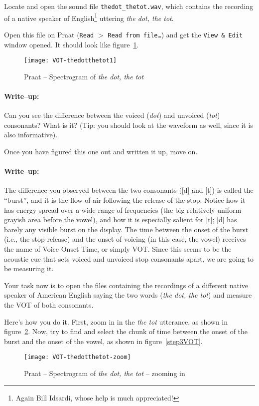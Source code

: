 \documentclass{article}
\newcommand{\soft}[1]{\textsf{#1}}
\newcommand{\filefmat}[1]{\texttt{#1}}
\newcommand{\softmenu}[1]{\texttt{#1}}
\newcommand{\Praat}{\soft{Praat}}
\begin{document}
Locate and open the sound file \filefmat{thedot\_thetot.wav}, which contains the recording of a native speaker of English\footnote{Again Bill Idsardi, whose help is much appreciated!} uttering \emph{the dot, the tot}.

Open this file on \Praat{} (\softmenu{Read} $>$ \softmenu{Read from file\ldots}) and get the \softmenu{View \& Edit} window opened. It should look like figure~\ref{step1VOT}.

\begin{figure}[!tbp]
\caption{\Praat{} -- Spectrogram of \emph{the dot, the tot}}
\label{step1VOT}
	\begin{center}
		\texttt{[image: VOT-thedotthetot1]}
	\end{center}
\end{figure}

\paragraph{Write--up:} Can you see the difference between the voiced (\emph{dot}) and unvoiced (\emph{tot}) consonants? What is it? (Tip: you should look at the waveform as well, since it is also informative).

Once you have figured this one out and written it up, move on.

\paragraph{Write--up:} The difference you observed between the two consonants ([d] and [t]) is called the ``burst'', and it is the flow of air following the release of the stop. Notice how it has energy spread over a wide range of frequencies (the big relatively uniform grayish area before the vowel), and how it is especially salient for [t]; [d] has barely any visible burst on the display. The time between the onset of the burst (i.e., the stop release) and the onset of voicing (in this case, the vowel) receives the name of Voice Onset Time, or simply VOT. Since this seems to be the acoustic cue that sets voiced and unvoiced stop consonants apart, we are going to be measuring it.

Your task now is to open the files containing the recordings of a different native speaker of American English saying the two words (\emph{the dot, the tot}) and measure the VOT of both consonants.

Here's how you do it. First, zoom in in the \emph{the tot} utterance, as shown in figure~\ref{step2VOT}. Now, try to find and select the chunk of time between the onset of the burst and the onset of the vowel, as shown in figure~\ref{step3VOT}. 
\begin{figure}[!tbp]
\caption{\Praat{} -- Spectrogram of \emph{the dot, the tot} -- zooming in}
\label{step2VOT}
	\begin{center}
		\texttt{[image: VOT-thedotthetot-zoom]}
	\end{center}
\end{figure}
\end{document}
